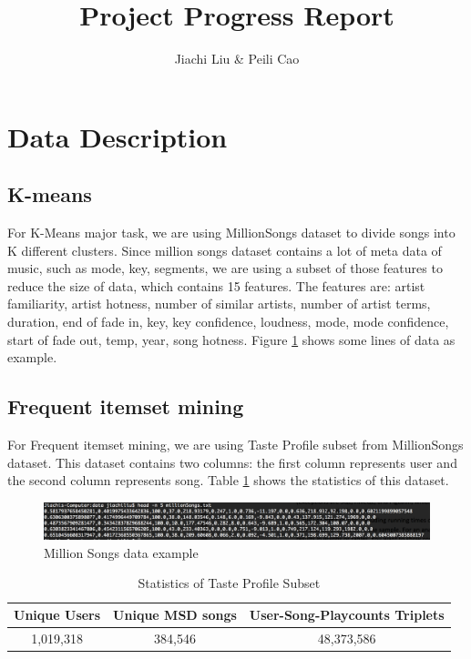 \documentclass[11pt]{article} %
\title{Project Progress Report}
\author{Jiachi Liu \& Peili Cao}
\begin{document}
\maketitle

\section{Data Description}
\subsection{K-means}

For K-Means major task, we are using MillionSongs dataset to divide songs into K different clusters. Since million songs dataset contains a lot of meta data of music, such as mode, key, segments, we are using a subset of those features to reduce the size of data, which contains 15 features. The features are: artist familiarity, artist hotness, number of similar artists, number of artist terms, duration, end of fade in, key, key confidence, loudness, mode, mode confidence, start of fade out, temp, year, song hotness. Figure \ref{fig:msd} shows some lines of data as example.

\subsection{Frequent itemset mining}

For Frequent itemset mining, we are using Taste Profile subset from MillionSongs dataset. This dataset contains two columns: the first column represents user and the second column represents song. Table \ref{table: stats-taste-dataset} shows the statistics of this dataset.

\begin{figure}[htbp]
\begin{center}
\includegraphics[scale=0.4]{millionsongs.png}
\caption{Million Songs data example}
\label{fig:msd}
\end{center}
\end{figure}

\begin{table}[htdp]
\caption{Statistics of Taste Profile Subset}
\begin{center}
\begin{tabular}{|c|c|c|}
\hline
Unique Users &Unique MSD songs &User-Song-Playcounts Triplets \\ \hline
1,019,318  & 384,546 & 48,373,586\\ \hline
\end{tabular}
\end{center}
\label{table: stats-taste-dataset}
\end{table}%
\end{document}
